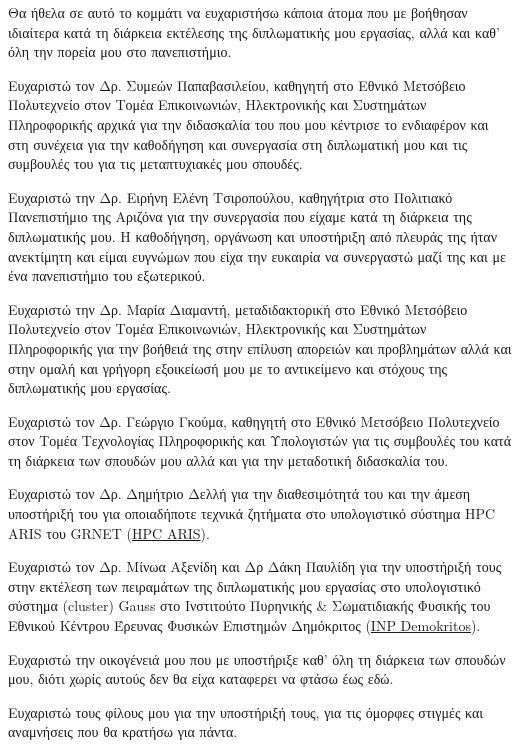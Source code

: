 \begin{acknowledgements}

Θα ήθελα σε αυτό το κομμάτι να ευχαριστήσω κάποια άτομα που με βοήθησαν ιδιαίτερα κατά τη διάρκεια εκτέλεσης της διπλωματικής μου εργασίας, αλλά και καθ' όλη την πορεία μου στο πανεπιστήμιο.

Ευχαριστώ τον Δρ. Συμεών Παπαβασιλείου, καθηγητή στο Εθνικό Μετσόβειο Πολυτεχνείο στον Τομέα Επικοινωνιών, Ηλεκτρονικής και Συστημάτων Πληροφορικής αρχικά για την διδασκαλία του που μου κέντρισε το ενδιαφέρον και στη συνέχεια για την καθοδήγηση και συνεργασία στη διπλωματική μου και τις συμβουλές του για τις μεταπτυχιακές μου σπουδές.

Ευχαριστώ την Δρ. Ειρήνη Ελένη Τσιροπούλου, καθηγήτρια στο Πολιτιακό Πανεπιστήμιο της Αριζόνα για την συνεργασία που είχαμε κατά τη διάρκεια της διπλωματικής μου. Η καθοδήγηση, οργάνωση και υποστήριξη από πλευράς της ήταν ανεκτίμητη και είμαι ευγνώμων που είχα την ευκαιρία να συνεργαστώ μαζί της και με ένα πανεπιστήμιο του εξωτερικού.

Ευχαριστώ την Δρ. Μαρία Διαμαντή, μεταδιδακτορική στο Εθνικό Μετσόβειο Πολυτεχνείο στον Τομέα Επικοινωνιών, Ηλεκτρονικής και Συστημάτων Πληροφορικής για την βοήθειά της στην επίλυση απορειών και προβλημάτων αλλά και στην ομαλή και γρήγορη εξοικείωσή μου με το αντικείμενο και στόχους της διπλωματικής μου εργασίας.

Ευχαριστώ τον Δρ. Γεώργιο Γκούμα, καθηγητή στο Εθνικό Μετσόβειο Πολυτεχνείο στον Τομέα Τεχνολογίας Πληροφορικής και Υπολογιστών για τις συμβουλές του κατά τη διάρκεια των σπουδών μου αλλά και για την μεταδοτική διδασκαλία του.

Ευχαριστώ τον Δρ. Δημήτριο Δελλή για την διαθεσιμότητά του και την άμεση υποστήριξή του για οποιαδήποτε τεχνικά ζητήματα στο υπολογιστικό σύστημα HPC ARIS του GRNET (\href{https://www.hpc.grnet.gr/}{HPC ARIS}).

Ευχαριστώ τον Δρ. Μίνωα Αξενίδη και Δρ Δάκη Παυλίδη για την υποστήριξή τους στην εκτέλεση των πειραμάτων της διπλωματικής μου εργασίας στο υπολογιστικό σύστημα (cluster) Gauss στο Ινστιτούτο Πυρηνικής \& Σωματιδιακής Φυσικής του Εθνικού Κέντρου Έρευνας Φυσικών Επιστημών Δημόκριτος (\href{https://www.demokritos.gr/el/institute/%CE%B9%CE%BD%CF%83%CF%84%CE%B9%CF%84%CE%BF%CF%8D%CF%84%CE%BF-%CF%80%CF%85%CF%81%CE%B7%CE%BD%CE%B9%CE%BA%CE%AE%CF%82-%CF%83%CF%89%CE%BC%CE%B1%CF%84%CE%B9%CE%B4%CE%B9%CE%B1%CE%BA%CE%AE%CF%82-%CF%86/}{INP Demokritos}).

Ευχαριστώ την οικογένειά μου που με υποστήριξε καθ' όλη τη διάρκεια των σπουδών μου, διότι χωρίς αυτούς δεν θα είχα καταφερει να φτάσω έως εδώ.

Ευχαριστώ τους φίλους μου για την υποστήριξή τους, για τις όμορφες στιγμές και αναμνήσεις που θα κρατήσω για πάντα.


\bigskip

\bigskip

\bigskip

\end{acknowledgements}